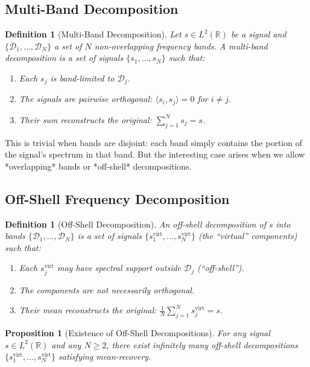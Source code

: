 \documentclass[twocolumn,11pt,a4paper]{article}
\newtheorem{proposition}[theorem]{Proposition}
\newtheorem{definition}[theorem]{Definition}
\newcommand{\signal}{s}
\newcommand{\domain}{\mathcal{D}}
\newcommand{\virt}{\text{virt}}
\begin{document}
\subsection{Multi-Band Decomposition}

\begin{definition}[Multi-Band Decomposition]
Let $\signal \in L^2(\mathbb{R})$ be a signal and $\{\domain_1, \ldots, \domain_N\}$ a set of $N$ non-overlapping frequency bands. A \emph{multi-band decomposition} is a set of signals $\{\signal_1, \ldots, \signal_N\}$ such that:
\begin{enumerate}[nosep,label=(\roman*)]
  \item Each $\signal_j$ is band-limited to $\domain_j$.
  \item The signals are pairwise orthogonal: $\langle \signal_i, \signal_j \rangle = 0$ for $i \neq j$.
  \item Their sum reconstructs the original: $\sum_{j=1}^{N} \signal_j = \signal$.
\end{enumerate}
\end{definition}

This is trivial when bands are disjoint: each band simply contains the portion of the signal's spectrum in that band. But the interesting case arises when we allow *overlapping* bands or *off-shell* decompositions.

\subsection{Off-Shell Frequency Decomposition}

\begin{definition}[Off-Shell Decomposition]
An \emph{off-shell decomposition} of $\signal$ into bands $\{\domain_1, \ldots, \domain_N\}$ is a set of signals $\{\signal_1^{\virt}, \ldots, \signal_N^{\virt}\}$ (the ``virtual'' components) such that:
\begin{enumerate}[nosep,label=(\roman*)]
  \item Each $\signal_j^{\virt}$ may have spectral support outside $\domain_j$ (``off-shell'').
  \item The components are not necessarily orthogonal.
  \item Their mean reconstructs the original: $\frac{1}{N}\sum_{j=1}^{N} \signal_j^{\virt} = \signal$.
\end{enumerate}
\end{definition}

\begin{proposition}[Existence of Off-Shell Decompositions]
For any signal $\signal \in L^2(\mathbb{R})$ and any $N \geq 2$, there exist infinitely many off-shell decompositions $\{\signal_1^{\virt}, \ldots, \signal_N^{\virt}\}$ satisfying mean-recovery.
\end{proposition}
\end{document}
